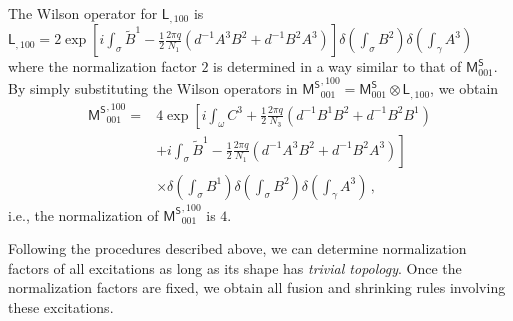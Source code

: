 \documentclass[11pt,nofootinbib,preprint]{revtex4-1}
\begin{document}
The Wilson operator for $\mathsf{L}_{,100}$ is $\mathsf{L}_{,100}=2\exp\left[i\int_{\sigma}\widetilde{B}^{1}-\frac{1}{2}\frac{2\pi q}{N_{1}}\left(d^{-1}A^{3}B^{2}+d^{-1}B^{2}A^{3}\right)\right]\delta\left(\int_{\sigma}B^{2}\right)\delta\left(\int_{\gamma}A^{3}\right)$
where the normalization factor $2$ is determined in a way similar
to that of $\mathsf{M}_{001}^{\mathsf{S}}$. By simply substituting
the Wilson operators in $\mathsf{M^{S}}_{001}^{,100}=\mathsf{M}_{001}^{\mathsf{S}}\otimes\mathsf{L}_{,100}$,
we obtain 
\begin{align}
	\mathsf{M^{S}}_{001}^{,100}= & 4\exp\left[i\int_{\omega}C^{3}+\frac{1}{2}\frac{2\pi q}{N_{3}}\left(d^{-1}B^{1}B^{2}+d^{-1}B^{2}B^{1}\right)\right.\nonumber \\
	& \left.+i\int_{\sigma}\widetilde{B}^{1}-\frac{1}{2}\frac{2\pi q}{N_{1}}\left(d^{-1}A^{3}B^{2}+d^{-1}B^{2}A^{3}\right)\right]\nonumber \\
	& \times\delta\left(\int_{\sigma}B^{1}\right)\delta\left(\int_{\sigma}B^{2}\right)\delta\left(\int_{\gamma}A^{3}\right)\,,
\end{align}
i.e., the normalization of $\mathsf{M^{S}}_{001}^{,100}$ is $4$. 

Following the procedures described above, we can determine normalization factors of all excitations as long as its shape has \emph{trivial topology}. Once the normalization factors are fixed, we obtain all fusion and shrinking rules involving these excitations. 
\end{document}

